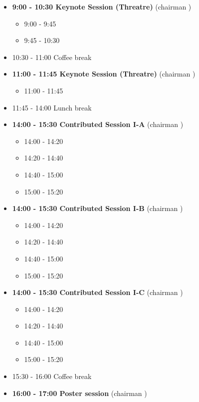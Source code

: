 \documentclass[10pt, A4]{article}
\begin{document}
\begin{itemize}    
  \item {\bf 9:00 - 10:30 Keynote Session (Threatre)} (chairman ) 
  \begin{itemize}
    \item 9:00 - 9:45
    \item 9:45 - 10:30 
  \end{itemize}
  \item 10:30 - 11:00 Coffee break
  \item {\bf 11:00 - 11:45 Keynote Session (Threatre)} (chairman ) 
  \begin{itemize}
    \item 11:00 - 11:45
  \end{itemize}
  \item 11:45 - 14:00 Lunch break      
  \item {\bf 14:00 - 15:30 Contributed Session I-A} (chairman ) 
  \begin{itemize}
    \item 14:00 - 14:20 
    \item 14:20 - 14:40 
    \item 14:40 - 15:00 
    \item 15:00 - 15:20 
  \end{itemize}
  \item {\bf 14:00 - 15:30 Contributed Session I-B} (chairman ) 
  \begin{itemize}
    \item 14:00 - 14:20 
    \item 14:20 - 14:40 
    \item 14:40 - 15:00 
    \item 15:00 - 15:20 
  \end{itemize}
    \item {\bf 14:00 - 15:30 Contributed Session I-C} (chairman ) 
  \begin{itemize}
    \item 14:00 - 14:20 
    \item 14:20 - 14:40 
    \item 14:40 - 15:00 
    \item 15:00 - 15:20 
  \end{itemize}
  \item 15:30 - 16:00 Coffee break
  \item {\bf 16:00 - 17:00 Poster session} (chairman )
\end{itemize}

\newpage
\end{document}
